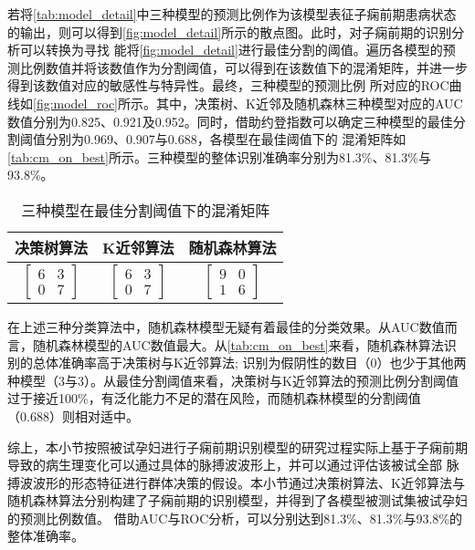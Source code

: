 若将\autoref{tab:model_detail}中三种模型的预测比例作为该模型表征子痫前期患病状态的输出，则可以得到\autoref{fig:model_detail}所示的散点图。此时，对子痫前期的识别分析可以转换为寻找
能将\autoref{fig:model_detail}进行最佳分割的阈值。遍历各模型的预测比例数值并将该数值作为分割阈值，可以得到在该数值下的混淆矩阵，并进一步得到该数值对应的敏感性与特异性。最终，三种模型的预测比例
所对应的ROC曲线如\autoref{fig:model_roc}所示。其中，决策树、K近邻及随机森林三种模型对应的AUC数值分别为0.825、0.921及0.952。同时，借助约登指数可以确定三种模型的最佳分割阈值分别为0.969、0.907与0.688，各模型在最佳阈值下的
混淆矩阵如\autoref{tab:cm_on_best}所示。三种模型的整体识别准确率分别为81.3\%、81.3\%与93.8\%。

\begin{table}[htbp]
      \centering
      \caption{\label{tab:cm_on_best}三种模型在最佳分割阈值下的混淆矩阵}
      \begin{tabular}{ccc}
      \toprule
      \textbf{决策树算法}&\textbf{K近邻算法}&\textbf{随机森林算法}\\
      \midrule
      $\left[ \begin{array}{cc} 6 & 3 \\ 0 & 7 \end{array} \right]$ & $\left[ \begin{array}{cc} 6 & 3 \\ 0 & 7 \end{array} \right]$ & $\left[ \begin{array}{cc} 9 & 0 \\ 1 & 6 \end{array} \right]$ \\
      \bottomrule
      \end{tabular}%
\end{table}%

在上述三种分类算法中，随机森林模型无疑有着最佳的分类效果。从AUC数值而言，随机森林模型的AUC数值最大。从\autoref{tab:cm_on_best}来看，随机森林算法识别的总体准确率高于决策树与K近邻算法;
识别为假阴性的数目（0）也少于其他两种模型（3与3）。从最佳分割阈值来看，决策树与K近邻算法的预测比例分割阈值过于接近100\%，有泛化能力不足的潜在风险，而随机森林模型的分割阈值（0.688）则相对适中。

综上，本小节按照被试孕妇进行子痫前期识别模型的研究过程实际上基于子痫前期导致的病生理变化可以通过具体的脉搏波波形上，并可以通过评估该被试全部
脉搏波波形的形态特征进行群体决策的假设。本小节通过决策树算法、K近邻算法与随机森林算法分别构建了子痫前期的识别模型，并得到了各模型被测试集被试孕妇的预测比例数值。
借助AUC与ROC分析，可以分别达到81.3\%、81.3\%与93.8\%的整体准确率。

